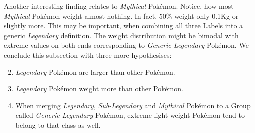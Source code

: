 \documentclass[conference]{IEEEtran}
\begin{document}
Another interesting finding relates to \textit{Mythical} Pokémon. Notice, how most \textit{Mythical} Pokémon weight almost nothing. In fact, $50\%$ weight only 0.1Kg or slightly more. This may be important, when combining all three Labels into a generic \textit{Legendary} definition. The weight distribution might be bimodal with extreme values on both ends corresponding to \textit{Generic Legendary} Pokémon.
We conclude this subsection with three more hypothesises:
\begin{enumerate}
	\setcounter{enumi}{1}
	\item \textit{Legendary} Pokémon are larger than other Pokémon.
	\item \textit{Legendary} Pokémon weight more than other Pokémon.
	\item When merging \textit{Legendary}, \textit{Sub-Legendary} and \textit{Mythical} Pokémon to a Group called \textit{Generic Legendary} Pokémon, extreme light weight Pokémon tend to belong to that class as well. 
\end{enumerate}
\end{document}
